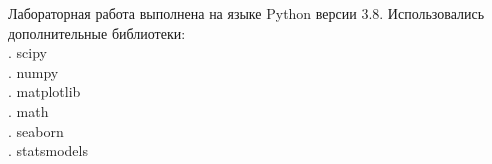\documentclass[../main.tex]{subfiles}
\begin{document}
    \noindent Лабораторная работа выполнена на языке Python версии 3.8. 
    \newline Использовались дополнительные библиотеки:\\
        . scipy\\
        . numpy\\
        . matplotlib\\
        . math\\
        . seaborn\\
        . statsmodels\\
\end{document}
